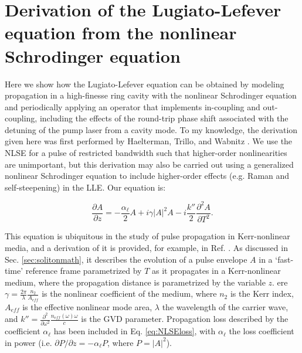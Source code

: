 \chapter{Derivation of the Lugiato-Lefever equation from the nonlinear Schrodinger equation}
 \label{app:LLEfromIkeda}


Here we show how the Lugiato-Lefever equation can be obtained by modeling propagation in a high-finesse ring cavity with the nonlinear Schrodinger equation and periodically applying an operator that implements in-coupling and out-coupling, including the effects of the round-trip phase shift associated with the detuning of the pump laser from a cavity mode. To my knowledge, the derivation given here was first performed by Haelterman, Trillo, and Wabnitz \cite{Haelterman1992a}. We use the NLSE for a pulse of restricted bandwidth such that higher-order nonlinearities are unimportant, but this derivation may also be carried out using a generalized nonlinear Schrodinger equation to include higher-order effects (e.g. Raman and self-steepening) in the LLE. Our equation is:


\begin{equation}
\frac{\partial A}{\partial z}= -\frac{\alpha_\ell}{2} A+i\gamma|A|^2 A -i \frac{k''}{2} \frac{\partial^2 A}{\partial T^2}. \label{eq:NLSEloss}
\end{equation}

This equation is ubiquitous in the study of pulse propagation in Kerr-nonlinear media, and a derivation of it is provided, for example, in Ref. \cite{Agrawal2007}. As discussed in Sec. \ref{sec:solitonmath}, it describes the evolution of a pulse envelope $A$ in a `fast-time' reference frame parametrized by $T$ as it propagates in a Kerr-nonlinear medium, where the propagation distance is parametrized by the variable $z$. ere $\gamma=\frac{2\pi}{\lambda}\frac{n_2}{A_{eff}}$ is the nonlinear coefficient of the medium, where $n_2$ is the Kerr index, $A_{eff}$ is the effective nonlinear mode area, $\lambda$ the wavelength of the carrier wave, and $k''=\frac{\partial^2}{\partial\omega^2}\frac{n_{eff}(\omega)\omega}{c}$ is the GVD parameter. Propagation loss described by the coefficient $\alpha_\ell$  has been included in Eq. \ref{eq:NLSEloss}, with $\alpha_\ell$ the loss coefficient in power (i.e. $\partial P/\partial z=-\alpha_\ell P$, where $P=|A|^2$).

